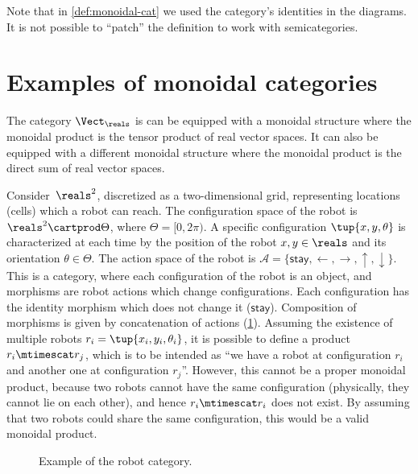 \begin{remark}
	Note that in \cref{def:monoidal-cat} we used the category's identities in the diagrams.
	It is not possible to ``patch'' the definition to work with semicategories.
\end{remark}

\section{Examples of monoidal categories}



\begin{example}
	\label{ex:Vect-symmetric-monoidal}
	The category $\Vect_\reals$ is can be equipped with a monoidal structure where the monoidal product is the tensor product of real vector spaces.
	It can also be equipped with a different monoidal structure where the monoidal product is the direct sum of real vector spaces.
\end{example}

\begin{example}
	\label{ex:robot}
	Consider~$\reals^2$, discretized as a two-dim\-ensional grid, representing locations (cells) which a robot can reach.
	The configuration space of the robot is $\reals^2\cartprod \Theta$, where $\Theta=[0,2\pi)$.
	A specific configuration $\tup{x,y,\theta}$ is characterized at each time by the position of the robot $x,y\in \reals$ and its orientation $\theta \in \Theta$.
	The action space of the robot is $\mathcal{A}=\{\mathsf{stay},\leftarrow, \rightarrow, \uparrow, \downarrow\}$.
	This is a category, where each configuration of the robot is an object, and morphisms are robot actions which change configurations.
	Each configuration has the identity morphism which does not change it ($\mathsf{stay}$).
	Composition of morphisms is given by concatenation of actions (\cref{fig:robotcategory}).
	Assuming the existence of multiple robots $r_i=\tup{x_i,y_i,\theta_i}$, it is possible to define a product $r_i\mtimescat r_j$, which is to be intended as ``we have a robot at configuration $r_i$ and another one at configuration $r_j$''.
	However, this cannot be a proper monoidal product, because two robots cannot have the same configuration (physically, they cannot lie on each other), and hence $r_i\mtimescat r_i$ does not exist.
	By assuming that two robots could share the same configuration, this would be a valid monoidal product.
	\begin{figure}[tbh]
		\centering
		\caption{Example of the robot category. }
		\label{fig:robotcategory}
	\end{figure}
\end{example}


